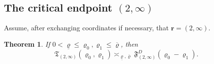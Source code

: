 \documentclass[11pt]{article}
\newtheorem{theorem}{Theorem}[section]
\theoremstyle{definition}
\theoremstyle{remark}
\numberwithin{equation}{section}
\begin{document}
\subsection{The critical endpoint $(2,\infty)$}

Assume, after exchanging coordinates if necessary, that
$\boldsymbol r=(2,\infty)$.

\begin{theorem}
\label{red:thm:transport-flow-endpoint}
If $0<\underline\varrho\le\varrho_0,\varrho_1\le\overline\varrho$, then
\begin{equation}
 \mathfrak T_{(2,\infty)}(\varrho_0,\varrho_1)
 \asymp_{\underline\varrho,\overline\varrho}
 \mathfrak F_{(2,\infty)}^{D}(\varrho_0-\varrho_1).
 \label{red:eq:endpoint-transport-flow}
\end{equation}
\end{theorem}
\end{document}
